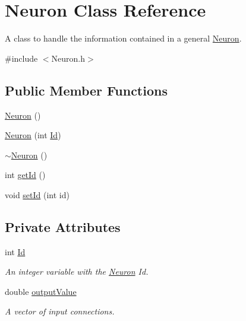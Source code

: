 \hypertarget{class_neuron}{
\section{Neuron Class Reference}
\label{class_neuron}
}


A class to handle the information contained in a general \hyperlink{class_neuron}{Neuron}.  




{\ttfamily \#include $<$Neuron.h$>$}

\subsection*{Public Member Functions}
\begin{DoxyCompactItemize}
\item 
\hyperlink{class_neuron_a823487d01615fadb8ac19a2768dd9d96}{Neuron} ()
\item 
\hyperlink{class_neuron_a05698a11ac18b6cee34d18f63681ddcc}{Neuron} (int \hyperlink{class_neuron_a72bb327a7c5c865e6748a4e074ce0680}{Id})
\item 
\hyperlink{class_neuron_a94a250ce7e167760e593979b899745b1}{$\sim$Neuron} ()
\item 
int \hyperlink{class_neuron_ad9211d55ea50ad6dfbd2676b9e2335e4}{getId} ()
\item 
void \hyperlink{class_neuron_aefc6637d3b0a20669af3b7e92a7bf209}{setId} (int id)
\end{DoxyCompactItemize}
\subsection*{Private Attributes}
\begin{DoxyCompactItemize}
\item 
int \hyperlink{class_neuron_a72bb327a7c5c865e6748a4e074ce0680}{Id}
\begin{DoxyCompactList}\small\item\em An integer variable with the \hyperlink{class_neuron}{Neuron} Id. \end{DoxyCompactList}\item 
double \hyperlink{class_neuron_ada029047646c36e525a6a1b77cafc03c}{outputValue}
\begin{DoxyCompactList}\small\item\em A vector of input connections. \end{DoxyCompactList}\end{DoxyCompactItemize}


